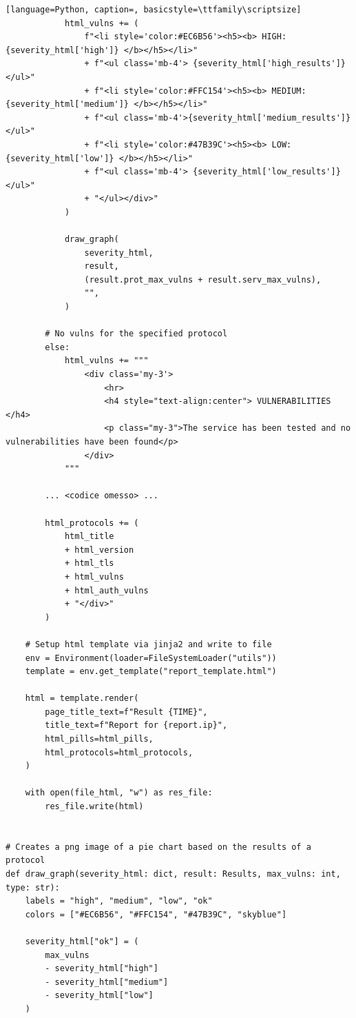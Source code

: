 \documentclass[12pt]{report}
\begin{document}
\begin{lstlisting}[language=Python, caption=, basicstyle=\ttfamily\scriptsize]
            html_vulns += (
                f"<li style='color:#EC6B56'><h5><b> HIGH: {severity_html['high']} </b></h5></li>"
                + f"<ul class='mb-4'> {severity_html['high_results']}</ul>"
                + f"<li style='color:#FFC154'><h5><b> MEDIUM: {severity_html['medium']} </b></h5></li>"
                + f"<ul class='mb-4'>{severity_html['medium_results']}</ul>"
                + f"<li style='color:#47B39C'><h5><b> LOW: {severity_html['low']} </b></h5></li>"
                + f"<ul class='mb-4'> {severity_html['low_results']}</ul>"
                + "</ul></div>"
            )

            draw_graph(
                severity_html,
                result,
                (result.prot_max_vulns + result.serv_max_vulns),
                "",
            )

        # No vulns for the specified protocol
        else:
            html_vulns += """
                <div class='my-3'>
                    <hr>
                    <h4 style="text-align:center"> VULNERABILITIES </h4>
                    <p class="my-3">The service has been tested and no vulnerabilities have been found</p>
                </div>
            """
        
        ... <codice omesso> ...

        html_protocols += (
            html_title
            + html_version
            + html_tls
            + html_vulns
            + html_auth_vulns
            + "</div>"
        )

    # Setup html template via jinja2 and write to file
    env = Environment(loader=FileSystemLoader("utils"))
    template = env.get_template("report_template.html")

    html = template.render(
        page_title_text=f"Result {TIME}",
        title_text=f"Report for {report.ip}",
        html_pills=html_pills,
        html_protocols=html_protocols,
    )

    with open(file_html, "w") as res_file:
        res_file.write(html)


# Creates a png image of a pie chart based on the results of a protocol
def draw_graph(severity_html: dict, result: Results, max_vulns: int, type: str):
    labels = "high", "medium", "low", "ok"
    colors = ["#EC6B56", "#FFC154", "#47B39C", "skyblue"]

    severity_html["ok"] = (
        max_vulns
        - severity_html["high"]
        - severity_html["medium"]
        - severity_html["low"]
    )


\end{lstlisting}
\end{document}
